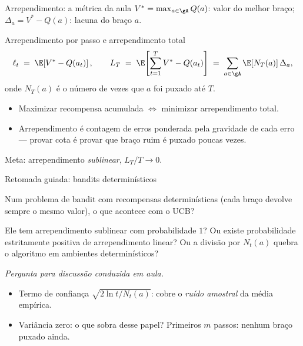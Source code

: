\documentclass[aspectratio=169, 11pt]{beamer}
\newcommand{\paradiscussao}{\smallskip
  {\footnotesize\color{rlCinza}\itshape Pergunta para discussão conduzida em aula.}}
\newcommand{\Vmax}{V^{*}}
\begin{document}
\begin{frame}{Arrependimento: a métrica da aula}
  $\Vmax = \max_{a \in \gA} Q(a)$: valor do melhor braço;
  $\Delta_a = \Vmax - Q(a)$: \alert{lacuna} do braço $a$.

  \begin{defbox}{Arrependimento por passo e arrependimento total}
    \[
      \ell_t \;=\; \E\!\left[\Vmax - Q(a_t)\right],
      \qquad
      L_T \;=\; \E\!\left[\sum_{t=1}^{T} \Vmax - Q(a_t)\right]
              \;=\; \sum_{a \in \gA} \E[N_T(a)]\,\Delta_a ,
    \]
    onde $N_T(a)$ é o número de vezes que $a$ foi puxado até $T$.
  \end{defbox}

  \begin{itemize}
    \item Maximizar recompensa acumulada $\iff$ minimizar arrependimento
          total.
    \item \alert{Arrependimento é contagem de erros ponderada pela
          gravidade de cada erro} — provar cota é provar que braço ruim é
          puxado poucas vezes.
  \end{itemize}

  \smallskip
  {\small\color{rlCinza} Meta: arrependimento \emph{sublinear},
  $L_T/T \to 0$.}
\end{frame}

\begin{frame}{Retomada guiada: bandits determinísticos}
  \begin{quizbox}{}
    Num problema de bandit com recompensas \alert{determinísticas} (cada
    braço devolve sempre o mesmo valor), o que acontece com o UCB?

    \smallskip
    Ele tem arrependimento sublinear com probabilidade $1$? Ou existe
    probabilidade estritamente positiva de arrependimento linear? Ou a
    divisão por $N_t(a)$ quebra o algoritmo em ambientes determinísticos?
  \end{quizbox}
  \paradiscussao

  \medskip
  \begin{itemize}
    \item Termo de confiança $\sqrt{2\ln t / N_t(a)}$: cobre o
          \emph{ruído amostral} da média empírica.
    \item Variância zero: o que sobra desse papel? Primeiros $m$ passos:
          nenhum braço puxado ainda.
  \end{itemize}
\end{frame}
\end{document}
